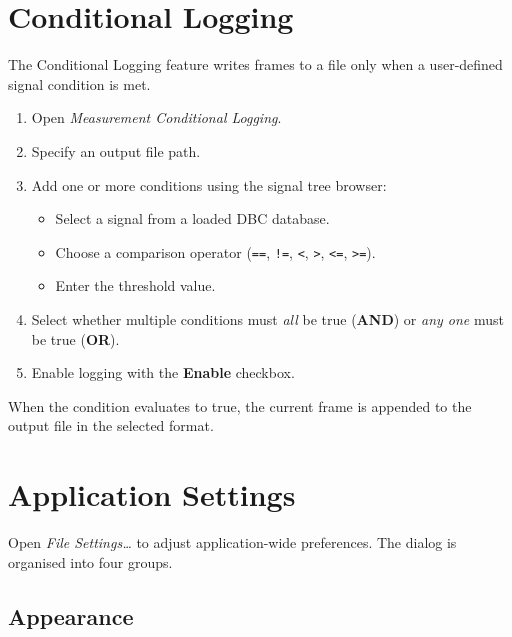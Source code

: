 \documentclass[a4paper,11pt]{article}
\newcommand{\menu}[1]{\textit{#1}}
\newcommand{\ui}[1]{\textbf{#1}}
\begin{document}
\section{Conditional Logging}

The Conditional Logging feature writes frames to a file only when a user-defined
signal condition is met.

\begin{enumerate}
  \item Open \menu{Measurement \textrightarrow{} Conditional Logging}.
  \item Specify an output file path.
  \item Add one or more conditions using the signal tree browser:
    \begin{itemize}
      \item Select a signal from a loaded DBC database.
      \item Choose a comparison operator (\texttt{==}, \texttt{!=}, \texttt{<},
            \texttt{>}, \texttt{<=}, \texttt{>=}).
      \item Enter the threshold value.
    \end{itemize}
  \item Select whether multiple conditions must \textit{all} be true (\ui{AND})
        or \textit{any one} must be true (\ui{OR}).
  \item Enable logging with the \ui{Enable} checkbox.
\end{enumerate}

When the condition evaluates to true, the current frame is appended to the output
file in the selected format.

\section{Application Settings}

Open \menu{File \textrightarrow{} Settings\ldots} to adjust application-wide
preferences. The dialog is organised into four groups.

\subsection*{Appearance}
\end{document}
